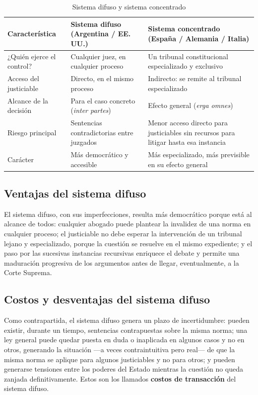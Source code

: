 \documentclass[12pt,oneside]{book}
\begin{document}
\begin{table}[H]
\centering
\caption{Sistema difuso y sistema concentrado}
\begin{tabularx}{\textwidth}{@{}lXX@{}}
\toprule
\textbf{Característica} & \textbf{Sistema difuso (Argentina / EE.\,UU.)} &
\textbf{Sistema concentrado (España / Alemania / Italia)} \\
\midrule
¿Quién ejerce el control? & Cualquier juez, en cualquier proceso & Un tribunal
constitucional especializado y exclusivo \\
Acceso del justiciable & Directo, en el mismo proceso & Indirecto: se remite al
tribunal especializado \\
Alcance de la decisión & Para el caso concreto (\textit{inter partes}) & Efecto
general (\textit{erga omnes}) \\
Riesgo principal & Sentencias contradictorias entre juzgados & Menor acceso
directo para justiciables sin recursos para litigar hasta esa instancia \\
Carácter & Más democrático y accesible & Más especializado, más previsible en su
efecto general \\
\bottomrule
\end{tabularx}
\end{table}

\subsection{Ventajas del sistema difuso}

El sistema difuso, con sus imperfecciones, resulta más democrático porque está al
alcance de todos: cualquier abogado puede plantear la invalidez de una norma en
cualquier proceso; el justiciable no debe esperar la intervención de un tribunal
lejano y especializado, porque la cuestión se resuelve en el mismo expediente; y
el paso por las sucesivas instancias recursivas enriquece el debate y permite una
maduración progresiva de los argumentos antes de llegar, eventualmente, a la Corte
Suprema.

\subsection{Costos y desventajas del sistema difuso}

Como contrapartida, el sistema difuso genera un plazo de incertidumbre: pueden
existir, durante un tiempo, sentencias contrapuestas sobre la misma norma; una ley
general puede quedar puesta en duda o inaplicada en algunos casos y no en otros,
generando la situación —a veces contraintuitiva pero real— de que la misma norma
se aplique para algunos justiciables y no para otros; y pueden generarse tensiones
entre los poderes del Estado mientras la cuestión no queda zanjada definitivamente.
Estos son los llamados \textbf{costos de transacción} del sistema difuso.
\end{document}
